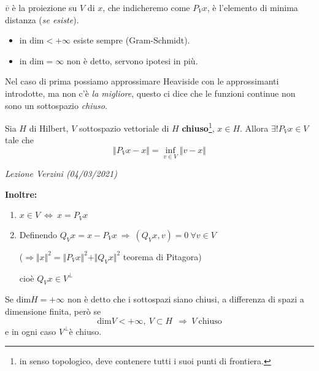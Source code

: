 \documentclass[10pt,a4paper,twoside,openright]{book}
\newcounter{conteggioV}
\newcommand{\LezioneV}[1]{
	\stepcounter{conteggioV}
	\textit{Lezione Verzini \arabic{conteggioV} (#1)}
	}
\begin{document}
\begin{figure}[htpb]
	
\end{figure}
\FloatBarrier

$\displaystyle \overline{v}$ è la proiezione su $V$ di $x$, che indicheremo come $P_{V} x$, è l'elemento di minima distanza (\textit{se esiste}).
\begin{itemize}
	\item in $\mathrm{dim} < +\infty $ esiste sempre (Gram-Schmidt).
	\item in $\mathrm{dim} =\infty $ non è detto, servono ipotesi in più.
\end{itemize}

Nel caso di prima possiamo approssimare Heaviside con le approssimanti introdotte, ma non c'è \textit{la migliore}, questo ci dice che le funzioni continue non sono un sottospazio \textit{chiuso}.
\begin{theorem}
	 Sia $H$ di Hilbert, $V$ sottospazio vettoriale di $H$ \textbf{chiuso}\footnote{in senso topologico, deve contenere tutti i suoi punti di frontiera.}, $x\in H$. Allora $\exists !P_{V} x\in V$ tale che
	\begin{equation*}
		\Vert P_{V} x-x\Vert =\inf_{v\in V}\Vert v-x\Vert 
	\end{equation*}
	\LezioneV{04/03/2021}
	
	\textbf{Inoltre:}
	\begin{enumerate}
		\item $\displaystyle x\in V\ \Leftrightarrow \ x=P_{V} x$
		\item Definendo $\displaystyle Q_{V} x=x-P_{V} x\ \Rightarrow \ (Q_{V} x,v) =0\ \forall v\in V$
		      
		      ($\displaystyle \Longrightarrow \Vert x\Vert ^{2} =\Vert P_{V} x\Vert ^{2} +\Vert Q_{V} x\Vert ^{2}$ teorema di Pitagora)
		      
		      cioè $\displaystyle Q_{V} x\in V^{\bot }$
	\end{enumerate}
\end{theorem}
\begin{nb}
	Se $\displaystyle \mathrm{dim} H\mathrm{=+\infty }$ non è detto che i sottospazi siano chiusi, a differenza di spazi a dimensione finita, però se
	\begin{equation*}
		\mathrm{dim} V< +\infty,\ V\subset H\ \ \Rightarrow \ V\ \text{chiuso}
	\end{equation*}
	e in ogni caso $\displaystyle V^{\bot }$è chiuso.
\end{nb}
\end{document}

